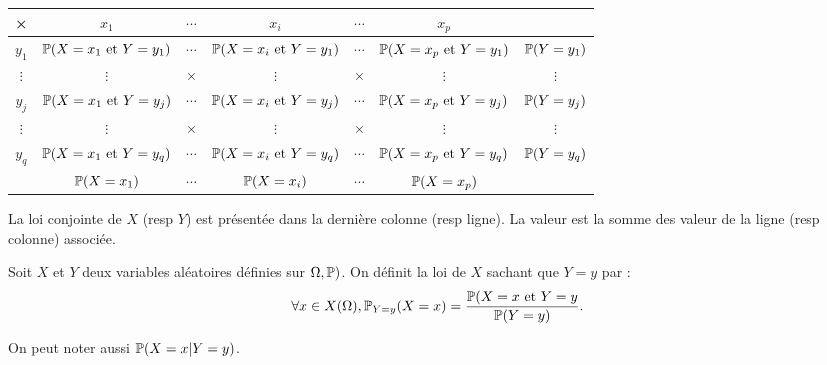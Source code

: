\begin{center}
\renewcommand{\arraystretch}{1.8}
\begin{tabular}{|c|c|c|c|c|c||c|}\hline
×        & $x_1$                        & $\cdots$ & $x_i$                       & $\cdots$ & $x_p$                        & \\ \hline
$y_1$    & $\mathbb{P}(X=x_1 \text{ et }Y=y_1)$ & $\cdots$ & $\mathbb{P}(X=x_i \text{ et }Y=y_1)$& $\cdots$ & $\mathbb{P}(X=x_p \text{ et }Y=y_1)$ & $\mathbb{P}(Y=y_1)$\\ \hline
$\vdots$ & $\vdots$                     & ×        & $\vdots$                    & ×        & $\vdots$                     &  $\vdots$ \\ \hline
$y_j$    & $\mathbb{P}(X=x_1 \text{ et }Y=y_j)$ & $\cdots$ & $\mathbb{P}(X=x_i \text{ et }Y=y_j)$& $\cdots$ & $\mathbb{P}(X=x_p \text{ et }Y=y_j)$ &  $\mathbb{P}(Y=y_j)$ \\ \hline
$\vdots$ & $\vdots$                     & ×        & $\vdots$                    & ×        & $\vdots$                     &  $\vdots$ \\ \hline
$y_q$    & $\mathbb{P}(X=x_1 \text{ et }Y=y_q)$ & $\cdots$ & $\mathbb{P}(X=x_i \text{ et }Y=y_q)$& $\cdots$ & $\mathbb{P}(X=x_p \text{ et }Y=y_q)$ &  $\mathbb{P}(Y=y_q)$ \\ \hline \hline
         & $\mathbb{P}(X=x_1)$                  & $\cdots$ & $\mathbb{P}(X=x_i)$                 & $\cdots$ & $\mathbb{P}(X=x_p)$& \\ \hline
\end{tabular}
\end{center}
La loi conjointe de $X$ (resp $Y$) est présentée dans la dernière colonne (resp ligne). La valeur est la somme des valeur de la ligne (resp colonne) associée.  
\begin{defi}
  Soit $X$ et $Y$ deux variables aléatoires définies sur $\Omega, \mathbb{P})$. On définit la loi de $X$ sachant que $Y=y$  par :
\[
  \forall x \in X(\Omega), \mathbb{P}_{Y = y}(X = x) = \frac{\mathbb{P}(X=x \text{ et } Y=y}{\mathbb{P}(Y=y)}.
\]
\end{defi}
\begin{nota}
  On peut noter aussi $\mathbb{P}(X=x | Y=y)$.
\end{nota}

